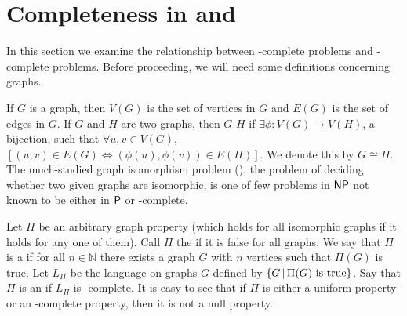 \section{Completeness in \texorpdfstring{\NPEq}{NPEq} and \texorpdfstring{\NP}{NP}}
\label{sec:npeqcompleteness}

In this section we examine the relationship between \NP-complete problems and \NPEq-complete problems.
Before proceeding, we will need some definitions concerning graphs.

If $G$ is a graph, then $V(G)$ is the set of vertices in $G$ and $E(G)$ is the set of edges in $G$.
If $G$ and $H$ are two graphs, then $G$  $H$ if $\exists\phi\colon V(G)\to V(H)$, a bijection, such that $\forall u,v\in V(G)$, $[(u,v)\in E(G)\iff (\phi(u), \phi(v))\in E(H)]$.
We denote this by $G\cong H$.
The much-studied graph isomorphism problem (\GI), the problem of deciding whether two given graphs are isomorphic, is one of few problems in $\NP$ not known to be either in $\P$ or \NP-complete.

Let $\Pi$ be an arbitrary graph property (which holds for all isomorphic graphs if it holds for any one of them).
Call $\Pi$ the  if it is false for all graphs.
We say that $\Pi$ is a  if for all $n\in\mathbb{N}$ there exists a graph $G$ with $n$ vertices such that $\Pi(G)$ is true.
Let $L_\Pi$ be the language on graphs $G$ defined by $\lb G\st\Pi(G)\textnormal{ is true}\rb$.
Say that $\Pi$ is an  if $L_\Pi$ is \NP-complete.
It is easy to see that if $\Pi$ is either a uniform property or an \NP-complete property, then it is not a null property.


